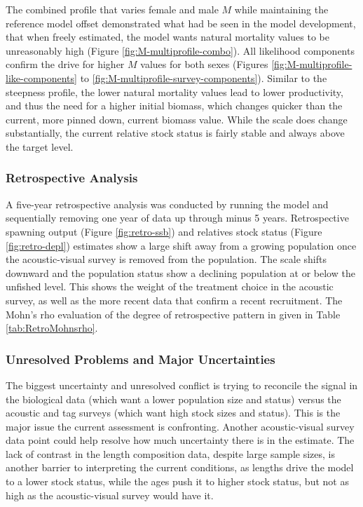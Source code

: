 \documentclass[11pt,
  english,
  letterpaper,
]{article}
\begin{document}
The combined profile that varies female and male \(M\) while maintaining the reference model offset demonstrated what had be seen in the model development, that when freely estimated, the model wants natural mortality values to be unreasonably high (Figure \ref{fig:M-multiprofile-combo}). All likelihood components confirm the drive for higher \(M\) values for both sexes (Figures \ref{fig:M-multiprofile-like-components} to \ref{fig:M-multiprofile-survey-components}). Similar to the steepness profile, the lower natural mortality values lead to lower productivity, and thus the need for a higher initial biomass, which changes quicker than the current, more pinned down, current biomass value. While the scale does change substantially, the current relative stock status is fairly stable and always above the target level.

\hypertarget{retrospective-analysis}{%
\subsubsection{Retrospective Analysis}\label{retrospective-analysis}}

A five-year retrospective analysis was conducted by running the model and sequentially removing one year of data up through minus 5 years. Retrospective spawning output (Figure \ref{fig:retro-ssb}) and relatives stock status (Figure \ref{fig:retro-depl}) estimates show a large shift away from a growing population once the acoustic-visual survey is removed from the population. The scale shifts downward and the population status show a declining population at or below the unfished level. This shows the weight of the treatment choice in the acoustic survey, as well as the more recent data that confirm a recent recruitment. The Mohn's rho evaluation of the degree of retrospective pattern in given in Table \ref{tab:RetroMohnsrho}.

\hypertarget{unresolved-problems-and-major-uncertainties-1}{%
\subsubsection{Unresolved Problems and Major Uncertainties}\label{unresolved-problems-and-major-uncertainties-1}}

The biggest uncertainty and unresolved conflict is trying to reconcile the signal in the biological data (which want a lower population size and status) versus the acoustic and tag surveys (which want high stock sizes and status). This is the major issue the current assessment is confronting. Another acoustic-visual survey data point could help resolve how much uncertainty there is in the estimate. The lack of contrast in the length composition data, despite large sample sizes, is another barrier to interpreting the current conditions, as lengths drive the model to a lower stock status, while the ages push it to higher stock status, but not as high as the acoustic-visual survey would have it.
\end{document}
